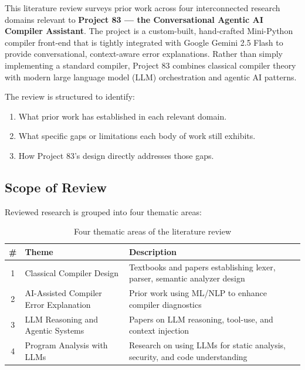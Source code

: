 \documentclass[a4paper,11pt]{article}
\begin{document}
This literature review surveys prior work across four interconnected research domains relevant to \textbf{Project 83 --- the Conversational Agentic AI Compiler Assistant}. The project is a custom-built, hand-crafted Mini-Python compiler front-end that is tightly integrated with Google Gemini 2.5 Flash to provide conversational, context-aware error explanations. Rather than simply implementing a standard compiler, Project 83 combines classical compiler theory with modern large language model (LLM) orchestration and agentic AI patterns.

The review is structured to identify:
\begin{enumerate}
    \item What prior work has established in each relevant domain.
    \item What specific gaps or limitations each body of work still exhibits.
    \item How Project 83's design directly addresses those gaps.
\end{enumerate}

\subsection{Scope of Review}

Reviewed research is grouped into four thematic areas:

\begin{table}[h!]
\centering
\begin{tabularx}{\textwidth}{|c|l|X|}
\hline
\rowcolor{blue!10}
\textbf{\#} & \textbf{Theme} & \textbf{Description} \\
\hline
1 & Classical Compiler Design & Textbooks and papers establishing lexer, parser, semantic analyzer design \\
\hline
2 & AI-Assisted Compiler Error Explanation & Prior work using ML/NLP to enhance compiler diagnostics \\
\hline
3 & LLM Reasoning and Agentic Systems & Papers on LLM reasoning, tool-use, and context injection \\
\hline
4 & Program Analysis with LLMs & Research on using LLMs for static analysis, security, and code understanding \\
\hline
\end{tabularx}
\caption{Four thematic areas of the literature review}
\end{table}

\newpage

\end{document}
